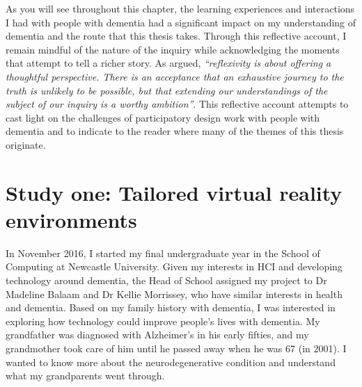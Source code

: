 As you will see throughout this chapter, the learning experiences and interactions I had with people with dementia had a significant impact on my understanding of dementia and the route that this thesis takes. Through this reflective account, I remain mindful of the nature of the inquiry while acknowledging the moments that attempt to tell a richer story. As \cite{cousin2013reflexivity} argued, \textit{``reflexivity is about offering a thoughtful perspective. There is an acceptance that an exhaustive journey to the truth is unlikely to be possible, but that extending our understandings of the subject of our inquiry is a worthy ambition''}. This reflective account attempts to cast  light on the challenges of participatory design work with people with dementia and to indicate to the reader where many of the themes of this thesis originate. 

\section{Study one: Tailored virtual reality environments}
\label{StudyOne}
In November 2016, I started my final undergraduate year in the School of Computing at Newcastle University. Given my interests in  HCI and developing technology around dementia, the Head of School assigned my project to Dr Madeline Balaam and Dr Kellie Morrissey, who have similar interests in health and dementia. Based on my family history with dementia, I was interested in exploring how technology could improve people's lives with dementia. My grandfather was diagnosed with Alzheimer’s in his early fifties, and my grandmother took care of him until he passed away when he was 67 (in 2001). I wanted to know more about the neurodegenerative condition and understand what my grandparents went through.

